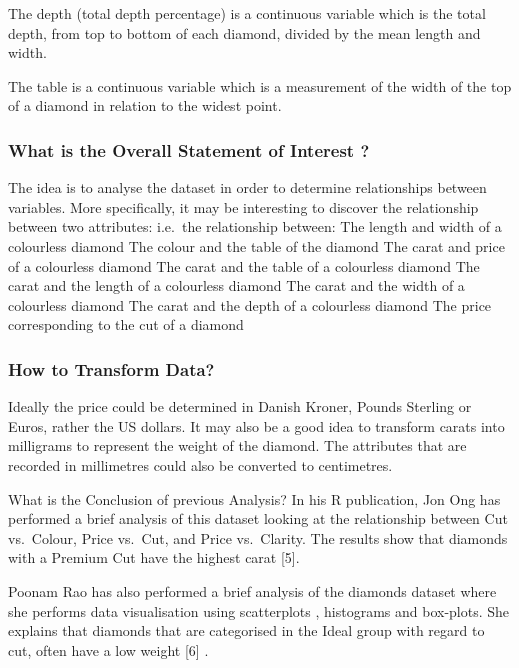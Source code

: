 \documentclass[
]{article}
\begin{document}
The depth (total depth percentage) is a continuous variable which is the
total depth, from top to bottom of each diamond, divided by the mean
length and width.

The table is a continuous variable which is a measurement of the width
of the top of a diamond in relation to the widest point.

\hypertarget{what-is-the-overall-statement-of-interest}{%
\subsubsection{What is the Overall Statement of Interest
?}\label{what-is-the-overall-statement-of-interest}}

The idea is to analyse the dataset in order to determine relationships
between variables. More specifically, it may be interesting to discover
the relationship between two attributes: i.e.~the relationship between:
The length and width of a colourless diamond The colour and the table of
the diamond The carat and price of a colourless diamond The carat and
the table of a colourless diamond The carat and the length of a
colourless diamond The carat and the width of a colourless diamond The
carat and the depth of a colourless diamond The price corresponding to
the cut of a diamond

\hypertarget{how-to-transform-data}{%
\subsubsection{How to Transform Data?}\label{how-to-transform-data}}

Ideally the price could be determined in Danish Kroner, Pounds Sterling
or Euros, rather the US dollars. It may also be a good idea to transform
carats into milligrams to represent the weight of the diamond. The
attributes that are recorded in millimetres could also be converted to
centimetres.

What is the Conclusion of previous Analysis? In his R publication, Jon
Ong has performed a brief analysis of this dataset looking at the
relationship between Cut vs.~Colour, Price vs.~Cut, and Price
vs.~Clarity. The results show that diamonds with a Premium Cut have the
highest carat {[}5{]}.

Poonam Rao has also performed a brief analysis of the diamonds dataset
where she performs data visualisation using scatterplots , histograms
and box-plots. She explains that diamonds that are categorised in the
Ideal group with regard to cut, often have a low weight {[}6{]} .
\end{document}
